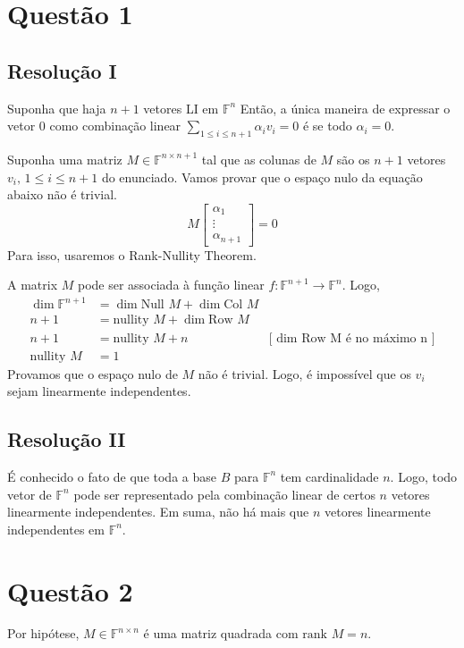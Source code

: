 \documentclass{article}
\newcommand{\F}[1]{\mathbb{F}^{#1}}
\newcommand{\Null}[1]{\textrm{Null } #1}
\newcommand{\Col}[1]{\textrm{Col } #1}
\newcommand{\nullity}[1]{\textrm{nullity } #1}
\newcommand{\rank}[1]{\textrm{rank } #1}
\begin{document}
\section*{Questão 1}
\subsection*{Resolução I}
Suponha que haja $n+1$ vetores LI em $\F{n}$
Então, a única maneira de expressar o vetor 0 como combinação linear $\sum_{1 \leq i \leq n+1} \alpha_i v_i = 0$ é se todo $\alpha_i = 0$.

Suponha uma matriz $M \in \F{n \times n+1}$ tal que as colunas de $M$ são os $n+1$ vetores $v_i, \, 1 \leq i \leq n+1$ do enunciado.
Vamos provar que o espaço nulo da equação abaixo não é trivial.
\[ M \begin{bmatrix} \alpha_1 \\ \vdots \\ \alpha_{n+1} \end{bmatrix} = 0 \]
Para isso, usaremos o Rank-Nullity Theorem.

A matrix $M$ pode ser associada à função linear $f: \F{n+1} \to \F{n}$. Logo,
\begin{align*}
    \dim \F{n+1} &= \dim \Null{M} + \dim \Col{M}\\
    n+1 &= \nullity{M}  + \dim \textrm{Row } M\\
    n+1 &= \nullity{M} + n &\textrm{[ dim Row M é no máximo n ]}\\
    \nullity{M} &= 1
\end{align*}
Provamos que o espaço nulo de $M$ não é trivial.
Logo, é impossível que os $v_i$ sejam linearmente independentes.

\subsection*{Resolução II}
É conhecido o fato de que toda a base $B$ para $\F{n}$ tem cardinalidade $n$.
Logo, todo vetor de $\F{n}$ pode ser representado pela combinação linear de certos $n$ vetores linearmente independentes.
Em suma, não há mais que $n$ vetores linearmente independentes em $\F{n}$.



\section*{Questão 2}
Por hipótese, $M \in \F{n \times n}$ é uma matriz quadrada com $\rank{M} = n$.
\end{document}
